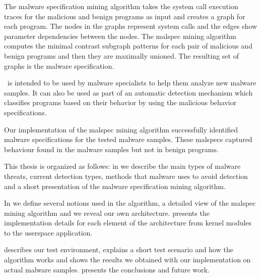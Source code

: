 The malware specification mining algorithm takes the system call execution traces for the malicious and benign programs as input and creates a graph for each program. The nodes in the graphs represent system calls and the edges show parameter dependencies between the nodes. The malspec mining algorithm computes the minimal contrast subgraph patterns for each pair of malicious and benign programs and then they are maximally unioned. The resulting set of graphs is the malware specification.

\project\ is intended to be used by malware specialists to help them analyze new malware samples. It can also be used as part of an automatic detection mechanism which classifies programs based on their behavior by using the malicious behavior specifications.

Our implementation of the malspec mining algorithm successfully identified malware specifications for the tested malware samples. These malspecs captured behaviour found in the malware samples but not in benign programs.

This thesis is organized as follows: in  we describe the main types of malware threats, current detection types, methods that malware uses to avoid detection and a short presentation of the malware specification mining algorithm.

In  we define several notions used in the algorithm, a detailed view of the malspec mining algorithm and we reveal our own architecture.  presents the implementation details for each element of the architecture from kernel modules to the userspace application.

 describes our test environment, explains a short test scenario and how the algorithm works and shows the results we obtained with our implementation on actual malware samples.  presents the conclusions and future work.